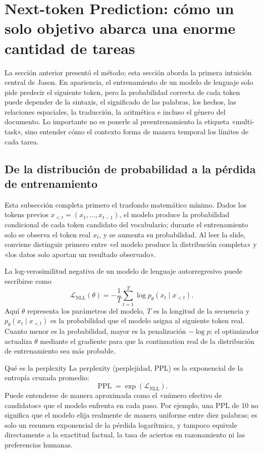 \section{Next-token Prediction: cómo un solo objetivo abarca una enorme cantidad de tareas}

La sección anterior presentó el método; esta sección aborda la primera intuición central de Jason. En apariencia, el entrenamiento de un modelo de lenguaje solo pide predecir el siguiente token, pero la probabilidad correcta de cada token puede depender de la sintaxis, el significado de las palabras, los hechos, las relaciones espaciales, la traducción, la aritmética e incluso el género del documento. Lo importante no es ponerle al preentrenamiento la etiqueta «multi-task», sino entender cómo el contexto forma de manera temporal los límites de cada tarea.

\subsection{De la distribución de probabilidad a la pérdida de entrenamiento}

Esta subsección completa primero el trasfondo matemático mínimo. Dados los tokens previos $x_{<t}=(x_1,\ldots,x_{t-1})$, el modelo produce la probabilidad condicional de cada token candidato del vocabulario; durante el entrenamiento solo se observa el token real $x_t$, y se aumenta su probabilidad. Al leer la slide, conviene distinguir primero entre «el modelo produce la distribución completa» y «los datos solo aportan un resultado observado».


La log-verosimilitud negativa de un modelo de lenguaje autorregresivo puede escribirse como
\[
\mathcal{L}_{\mathrm{NLL}}(\theta)=-\frac{1}{T}\sum_{t=1}^{T}\log p_{\theta}(x_t\mid x_{<t}).
\]
Aquí $\theta$ representa los parámetros del modelo, $T$ es la longitud de la secuencia y $p_{\theta}(x_t\mid x_{<t})$ es la probabilidad que el modelo asigna al siguiente token real. Cuanto menor es la probabilidad, mayor es la penalización $-\log p$; el optimizador actualiza $\theta$ mediante el gradiente para que la continuation real de la distribución de entrenamiento sea más probable.

\begin{knowledgebox}{Qué es la perplexity}
La perplexity (perplejidad, PPL) es la exponencial de la entropía cruzada promedio:
\[
\operatorname{PPL}=\exp\!\left(\mathcal{L}_{\mathrm{NLL}}\right).
\]
Puede entenderse de manera aproximada como el «número efectivo de candidatos» que el modelo enfrenta en cada paso. Por ejemplo, una PPL de 10 no significa que el modelo elija realmente de manera uniforme entre diez palabras; es solo un resumen exponencial de la pérdida logarítmica, y tampoco equivale directamente a la exactitud factual, la tasa de aciertos en razonamiento ni las preferencias humanas.
\end{knowledgebox}

